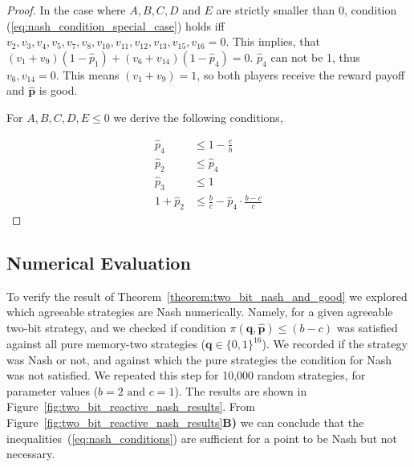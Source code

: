 \documentclass{article}
\theoremstyle{definition}
\begin{document}
\begin{proof}
    In the case where \(A, B, C, D\) and \(E\) are strictly smaller than 0, condition
    (\ref{eq:nash_condition_special_case}) holds iff \(v_2, v_3,
    v_4, v_5, v_7, v_8, v_{10},
    v_{11}, \allowbreak v_{12}, v_{13}, v_{15}, v_{16} =
    0\). This implies, that \((v_1 + v_9) (1 - \hat{p}_1) + (v_6 +
    v_{14}) (1 - \hat{p}_4) = 0\). \(\hat{p}_4\) can not be 1, thus \(v_6,
    v_{14} = 0\). This means \((v_1 + v_9) = 1\), so both
    players receive the reward payoff and \(\mathbf{\hat{p}}\) is good.
    
    For \(A, B, C, D, E \leq 0\) we derive the following conditions,
    
    \begin{align}\label{eq:nash_conditions}
    \hat{p}_4       & \leq 1 - \frac{c}{b} \\
    \hat{p}_2       & \leq \hat{p}_4 \\
    \hat{p}_3       & \leq 1 \\
    1 + \hat{p}_2 & \leq \frac{b}{c} - \hat{p}_4 \cdot \frac{b\!-\!c}{c}
    \end{align}
\end{proof}

\subsection{Numerical Evaluation}

To verify the result of Theorem~\ref{theorem:two_bit_nash_and_good} we explored
which agreeable strategies are Nash numerically. Namely, for a given agreeable
two-bit strategy, and we checked if condition \(\pi({\mathbf{q}},
\mathbf{\hat{p}}) \leq (b\!-\!c)\) was satisfied against all pure memory-two
strategies (\(\mathbf{q} \in \{0, 1\}^{16}\)). We recorded if the strategy was
Nash or not, and against which the pure strategies the condition for Nash was
not satisfied. We repeated this step for 10,000 random strategies, for parameter
values (\(b=2 \text{ and } c=1\)). The results are shown in
Figure~\ref{fig:two_bit_reactive_nash_results}. From
Figure~\ref{fig:two_bit_reactive_nash_results}\textbf{B)} we can conclude that
the inequalities~(\ref{eq:nash_conditions}) are sufficient for a point to be
Nash but not necessary.
\end{document}
